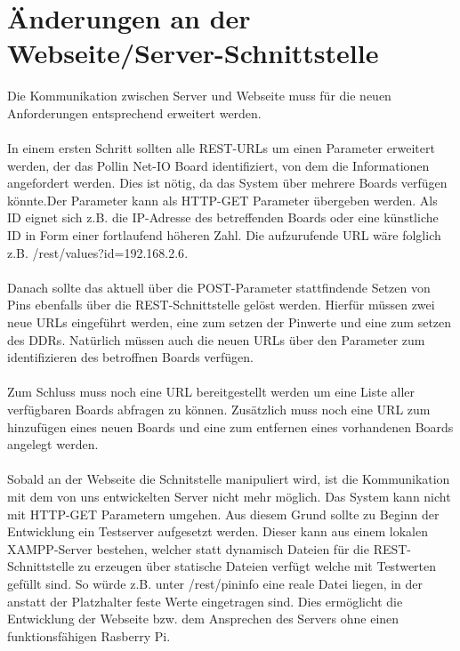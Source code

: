 \section{Änderungen an der Webseite/Server-Schnittstelle}
\label{aenderung_schnitstelle}
Die Kommunikation zwischen Server und Webseite muss für die neuen Anforderungen
entsprechend erweitert werden. \\
\\
In einem ersten Schritt sollten alle REST-URLs um einen Parameter erweitert
werden, der das Pollin Net-IO Board identifiziert, von dem die Informationen
angefordert werden. Dies ist nötig, da das System über mehrere Boards
verfügen könnte.Der Parameter kann als HTTP-GET Parameter übergeben werden. Als
ID eignet sich z.B. die IP-Adresse des betreffenden Boards oder eine künstliche 
ID in Form einer fortlaufend höheren Zahl. Die aufzurufende URL wäre folglich
z.B. \textrm{/rest/values?id=192.168.2.6}.\\
\\
Danach sollte das aktuell über die POST-Parameter stattfindende
Setzen von Pins ebenfalls über die REST-Schnittstelle gelöst werden. Hierfür
müssen zwei neue URLs eingeführt werden, eine zum setzen der Pinwerte und eine
zum setzen des DDRs. Natürlich müssen auch die neuen URLs über den
Parameter zum identifizieren des betroffnen Boards verfügen.\\
\\
Zum Schluss muss noch eine URL bereitgestellt werden um eine Liste aller
verfügbaren Boards abfragen zu können. Zusätzlich muss noch eine URL zum
hinzufügen eines neuen Boards und eine zum entfernen eines vorhandenen Boards
angelegt werden.\\
\\
Sobald an der Webseite die Schnitstelle manipuliert wird, ist die Kommunikation
mit dem von uns entwickelten Server nicht mehr möglich. Das System kann nicht
mit HTTP-GET Parametern umgehen. Aus diesem Grund sollte zu Beginn der
Entwicklung ein Testserver aufgesetzt werden. Dieser kann aus einem lokalen
XAMPP-Server bestehen, welcher statt dynamisch Dateien für die
REST-Schnittstelle zu erzeugen über statische Dateien verfügt welche mit
Testwerten gefüllt sind. So würde z.B. unter \textrm{/rest/pininfo} eine reale
Datei liegen, in der anstatt der Platzhalter feste Werte eingetragen sind. Dies
ermöglicht die Entwicklung der Webseite bzw. dem Ansprechen des Servers ohne
einen funktionsfähigen Rasberry Pi.

